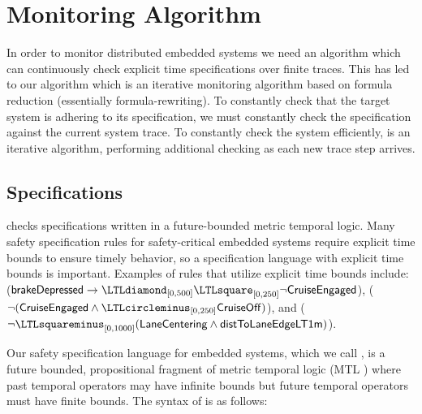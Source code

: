 
\section{Monitoring Algorithm}

In order to monitor distributed embedded systems we need an algorithm which can continuously check explicit time specifications over finite traces. This has led to our algorithm \monitor which is an iterative monitoring algorithm based on formula reduction (essentially formula-rewriting). 
%
To constantly check that the target system is adhering to its specification, we must constantly check the specification against the current system trace. To constantly check the system efficiently, \monitor is an iterative algorithm, performing additional checking as each new trace step arrives.

\subsection{Specifications}
\monitor checks specifications written in a future-bounded metric temporal logic. Many safety specification rules for safety-critical embedded systems require explicit time bounds to ensure timely behavior, so a specification language with explicit time bounds is important. 
Examples of rules that utilize explicit time bounds include: %
 ($\pred{brakeDepressed} \rightarrow \eventually_{[0, 500]} \henceforth_{[0,250]} \neg \pred{CruiseEngaged}$), 
 ($\neg (\pred{CruiseEngaged} \wedge \yesterday_{[0,250]} \pred{CruiseOff})$), 
and  ($\neg \historically_{[0, 1000]}(\pred{LaneCentering} \wedge \pred{distToLaneEdgeLT1m})$).

Our safety specification language for embedded systems, which we call \planguage, is a future bounded, propositional fragment of metric temporal logic (MTL \cite{Koymans1990}) where past temporal operators may have infinite bounds but future temporal operators must have finite bounds. 
The syntax of \planguage is as follows:

